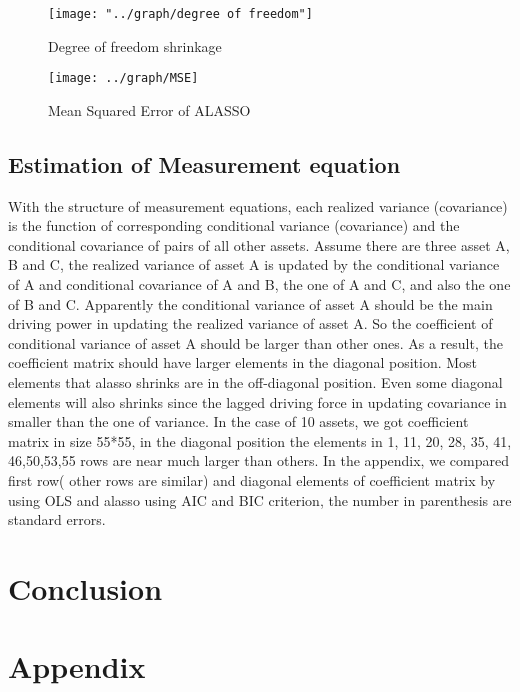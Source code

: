 \documentclass[titlepage,11pt]{article}
\begin{document}
 \begin{figure} [!htbp]
 	\centering
 	\texttt{[image: "../graph/degree of freedom"]}
 	\caption{Degree of freedom shrinkage}
 	\label{fig:degreeoffreedom}
 \end{figure}
 
 \begin{figure} [!htbp]
 	\centering
 	\texttt{[image: ../graph/MSE]}
 	\caption{Mean Squared Error of ALASSO}
 	\label{fig:MSE}
 \end{figure}
 
\subsection{Estimation of Measurement equation}
With the structure of measurement equations, each realized variance (covariance) is the function of  corresponding conditional variance (covariance) and the conditional covariance of pairs of all other assets. Assume there are three asset A, B and C, the realized variance of asset A is updated by the conditional variance of A and conditional covariance of A and B, the one of A and C,  and also the one of B and C. Apparently the conditional variance of asset A should be the main driving power in updating the realized variance of asset A. So  the coefficient of  conditional variance of asset A should be larger than other ones. As a result, the coefficient matrix should have larger elements in the diagonal position. Most elements that alasso shrinks are in the off-diagonal position. Even some diagonal elements will also shrinks since the lagged driving force in updating covariance in smaller than the one of variance. In the case of 10 assets, we got coefficient matrix in size 55*55, in the diagonal position the elements in 1, 11, 20, 28, 35, 41, 46,50,53,55 rows are near much larger than others.  In the appendix, we compared first row( other rows are similar) and diagonal elements of coefficient matrix by using OLS and alasso using AIC and BIC criterion, the number in parenthesis are standard errors.


\section{Conclusion}

\section*{Appendix}
\end{document}
